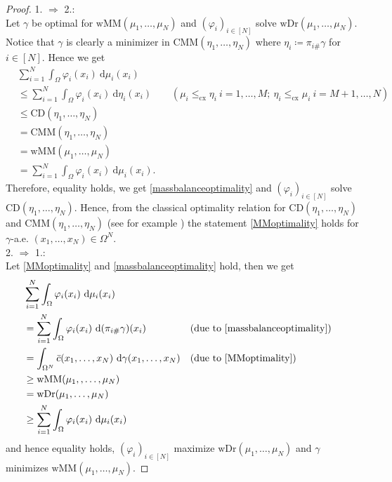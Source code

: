 \documentclass[letterpaper]{amsart}
\newcommand{\dd}{\mathrm{d}}
\theoremstyle{definition}
\begin{document}
\begin{proof}
	1. $\Rightarrow$ 2.:\\
	Let $\gamma$ be optimal for $\text{wMM}(\mu_1,\dots,\mu_N)$ and $(\varphi_i)_{i\in[N]}$ solve $\text{wDr}(\mu_1,\dots,\mu_N)$. Notice that $\gamma$ is clearly a minimizer in $\text{CMM}(\eta_1,\dots,\eta_N)$ where $\eta_i\coloneqq \pi_{i\#}\gamma$ for $i\in[N]$.
	Hence we get
	\begin{align*}
		&\sum_{i=1}^N\int_\Omega\varphi_i(x_i)\ \dd\mu_i(x_i)\\
		&\leq\sum_{i=1}^N\int_\Omega\varphi_i(x_i)\ \dd\eta_i(x_i)&&(\mu_i\leq_{\text{cx}}\eta_i\ i=1,\dots,M;\ \eta_i\leq_{\text{cx}}\mu_i\ i=M+1,\dots,N)\\
		&\leq\text{CD}(\eta_1,\dots,\eta_N)\\
		&=\text{CMM}(\eta_1,\dots,\eta_N)\\
		&=\text{wMM}(\mu_1,\dots,\mu_N)\\
		&=\sum_{i=1}^N\int_\Omega\varphi_i(x_i)\ \dd\mu_i(x_i).
	\end{align*}
	Therefore, equality holds, we get \eqref{massbalanceoptimality}
	and $(\varphi_i)_{i\in[N]}$ solve $\text{CD}(\eta_1,\dots,\eta_N)$. Hence, from the classical optimality relation for $\text{CD}(\eta_1,\dots,\eta_N)$ and $\text{CMM}(\eta_1,\dots,\eta_N)$ (see for example \cite[Prop 2.3]{kim2014}) the statement
	\eqref{MMoptimality}
	holds for $\gamma$-a.e. $(x_1,\dots,x_N)\in\Omega^N$.\\
	2. $\Rightarrow$ 1.:\\
	Let \eqref{MMoptimality} and \eqref{massbalanceoptimality} hold, then we get
	\begin{align*}
		&\sum_{i=1}^N\int_\Omega\varphi_i(x_i)\ \dd\mu_i(x_i)\\
		&=\sum_{i=1}^N\int_\Omega\varphi_i(x_i)\ \dd(\pi_{i\#}\gamma)(x_i)&&(\text{due to \eqref{massbalanceoptimality}})\\
		&=\int_{\Omega^N}\bar c(x_1,\dots,x_N)\ \dd\gamma(x_1,\dots,x_N)&&(\text{due to \eqref{MMoptimality}})\\
		&\geq\text{wMM}(\mu_1,,\dots,\mu_N)\\
		&=\text{wDr}(\mu_1,\dots,\mu_N)\\
		&\geq\sum_{i=1}^N\int_\Omega\varphi_i(x_i)\ \dd\mu_i(x_i)
	\end{align*}
	and hence equality holds, $(\varphi_i)_{i\in[N]}$ maximize $\text{wDr}(\mu_1,\dots,\mu_N)$ and $\gamma$ minimizes $\text{wMM}(\mu_1,\dots,\mu_N)$.
\end{proof}
\end{document}
